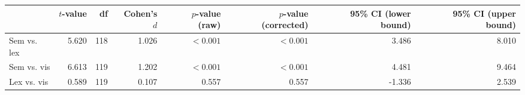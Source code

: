 \begin{tabular}{lrrrrrrr}
\toprule
{} & $t$-value &  df & Cohen's $d$ & $p$-value (raw) & $p$-value (corrected) & 95\% CI (lower bound) & 95\% CI (upper bound) \\
\midrule
Sem vs. lex &     5.620 & 118 &       1.026 &       $< 0.001$ &             $< 0.001$ &                 3.486 &                 8.010 \\
Sem vs. vis &     6.613 & 119 &       1.202 &       $< 0.001$ &             $< 0.001$ &                 4.481 &                 9.464 \\
Lex vs. vis &     0.589 & 119 &       0.107 &           0.557 &                 0.557 &                -1.336 &                 2.539 \\
\bottomrule
\end{tabular}
